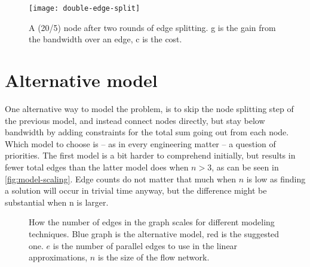 \begin{figure}
    \centering
    \texttt{[image: double-edge-split]}
    \caption{A (20/5) node after two rounds of edge splitting. g is the gain from the bandwidth over an edge, c is the cost.}
    \label{fig:double-edge-split}
\end{figure}


\section{Alternative model}\label{sec:alternative-model}

One alternative way to model the problem, is to skip the node splitting step of the previous model, and instead connect nodes directly, but stay below bandwidth by adding constraints for the total sum going out from each node. Which model to choose is -- as in every engineering matter -- a question of priorities. The first model is a bit harder to comprehend initially, but results in fewer total edges than the latter model does when $n>3$, as can be seen in \autoref{fig:model-scaling}. Edge counts do not matter that much when $n$ is low as finding a solution will occur in trivial time anyway, but the difference might be substantial when n is larger. 

\begin{figure}
    \centering
    \caption{How the number of edges in the graph scales for different modeling techniques. Blue graph is the alternative model, red is the suggested one. $e$ is the number of parallel edges to use in the linear approximations, $n$ is the size of the flow network.}
    \label{fig:model-scaling}
\end{figure}


